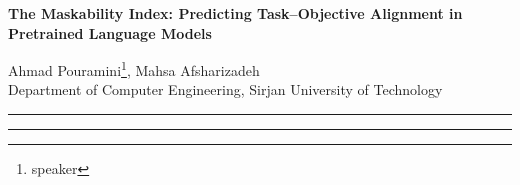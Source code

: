 \documentclass{i4c-en}
\begin{document}
	\thispagestyle{plain}
	\vspace*{-2cm}
	\vspace*{0.5cm}
	
	\begin{center}
		{\Large\bf The Maskability Index: Predicting Task--Objective Alignment in Pretrained Language Models}
		\vspace*{0.5cm}
		
			{\small Ahmad Pouramini}\footnote{speaker}, 
	{\small Mahsa Afsharizadeh}\\
	{\small Department of Computer Engineering, Sirjan University of Technology}\\[2mm]
		
	\end{center}
	
	\vspace*{0.5cm}
	
	\hspace{-1cm}\rule{\textwidth}{0.2mm}
	
	\begin{abstract}
	Large-scale pretrained language models such as T5 and BERT have shown the ability to generate structured  knowledge, but their effectiveness depends strongly on how the prompting style aligns with the model’s pretraining objectives. We introduce the \textbf{Maskability Index (MI)}, a quantitative measure that estimates how well a knowledge relation benefits from masked-style prompting compared to prefix-style prompting in few-shot generative settings. MI is computed from DepthRank differences between masked and unmasked templates, offering a principled way to capture objective–template alignment. We validate MI on a wide range of relations from the ATOMIC2020 knowledge base completion benchmark and show that it correlates with downstream generation quality. Our results suggest that MI can guide the choice of template families and adaptation strategies when mining relational knowledge from pretrained models, particularly in low-resource conditions.
\end{abstract}


	
\hspace{-1cm}\rule{\textwidth}{0.2mm}
\end{document}
